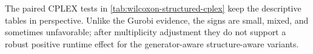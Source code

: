 \documentclass[AMA,Times1COL]{WileyNJDv5} %
\newcommand{\methodBase}{Base}
\newcommand{\methodAug}{SA-Aug}
\newcommand{\methodMat}{SA-Mat}
\newcommand{\methodRuiz}{Ruiz}
\providecommand{\DIFadd}[1]{{\protect\color{blue} \sf #1}} %
\providecommand{\DIFdel}[1]{{\protect\color{red} \scriptsize #1}} %
\providecommand{\DIFaddbegin}{} %
\providecommand{\DIFaddend}{} %
\providecommand{\DIFdelbegin}{} %
\providecommand{\DIFdelend}{} %
\begin{document}
\noindent The paired CPLEX tests in \cref{tab:wilcoxon-structured-cplex} keep the descriptive tables in perspective. Unlike the Gurobi evidence, the signs are small, mixed, and sometimes unfavorable; after multiplicity adjustment they do not support a robust positive runtime effect for the \DIFdelbegin \DIFdel{generator-aware }\DIFdelend \DIFaddbegin \DIFadd{structure-aware }\DIFaddend variants.

\DIFdelbegin %
\end{document}
